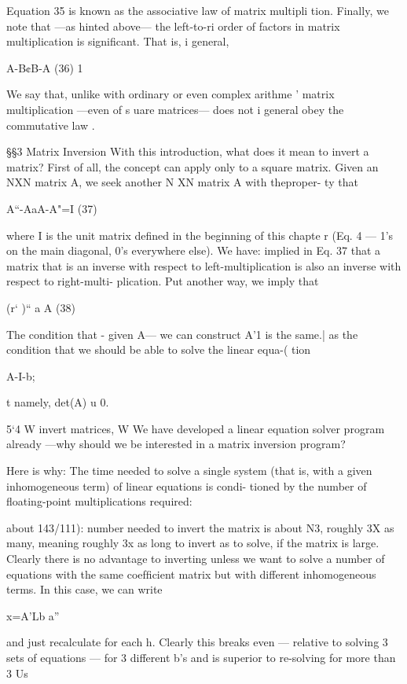 {{{{{{{{{{{Equation 35 is known as the associative law of matrix multipli
tion. Finally, we note that —as hinted above— the left-to-ri
order of factors in matrix multiplication is signiﬁcant. That is, i
general,

A-B¢B-A (36) 1

We say that, unlike with ordinary or even complex arithme '
matrix multiplication —even of s uare matrices— does not i
general obey the commutative law .

\S\S3 Matrix Inversion
With this introduction, what does it mean to invert a matrix? First
of all, the concept can apply only to a square matrix. Given an
NXN matrix A, we seek another N XN matrix A with theproper-
ty that

 

A“-AaA-A"=I (37)

where I is the unit matrix deﬁned in the beginning of this chapte r
(Eq. 4 — 1’s on the main diagonal, 0’s everywhere else). We have:
implied in Eq. 37 that a matrix that is an inverse with respect to
left-multiplication is also an inverse with respect to right-multi-
plication. Put another way, we imply that

(r‘ )“ a A (38)

The condition that - given A— we can construct A'1 is the same.|
as the condition that we should be able to solve the linear equa-(
tion

A-I-b;

t namely, det(A) u 0.

5‘4 W invert matrices, W
We have developed a linear equation solver program already
—why should we be interested in a matrix inversion program?

Here is why: The time needed to solve a single system (that is,
with a given inhomogeneous term) of linear equations is condi-
tioned by the number of ﬂoating-point multiplications required:

about 143/111): number needed to invert the matrix is about N3,
roughly 3X as many, meaning roughly 3x as long to invert as to
solve, if the matrix is large. Clearly there is no advantage to
inverting unless we want to solve a number of equations with the
same coefﬁcient matrix but with different inhomogeneous terms.
In this case, we can write

x=A'Lb a”

and just recalculate for each h. Clearly this breaks even — relative
to solving 3 sets of equations — for 3 different b's and is superior
to re-solving for more than 3 Us

}}}}}}}}}}}

